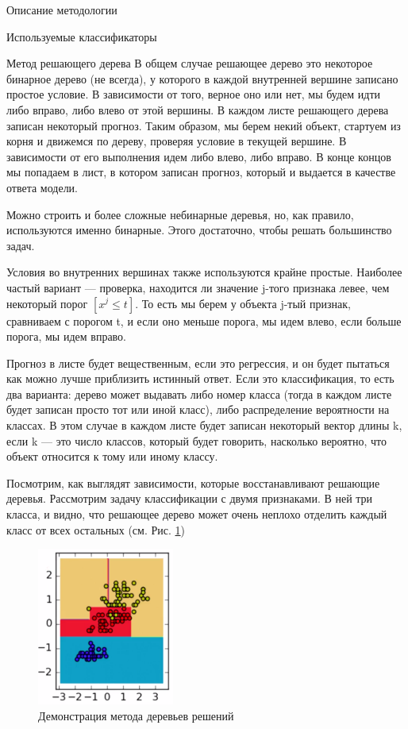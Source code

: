 \begin{section}{Описание методологии}
\begin{subsection}{Используемые классификаторы}
\begin{subsubsection}{Метод решающего дерева}
 В общем случае решающее дерево это некоторое бинарное дерево (не всегда), у которого в каждой внутренней вершине записано простое условие. В зависимости от того, верное оно или нет, мы будем идти либо вправо, либо влево от этой вершины. В каждом листе решающего дерева записан некоторый прогноз. Таким образом, мы берем некий объект, стартуем из корня и движемся по дереву, проверяя условие в текущей вершине. В зависимости от его выполнения идем либо влево, либо вправо. В конце концов мы попадаем в лист, в котором записан прогноз, который и выдается в качестве ответа модели.

 Можно строить и более сложные небинарные деревья, но, как правило, используются именно бинарные. Этого достаточно, чтобы решать большинство задач.


 Условия во внутренних вершинах также используются крайне простые. Наиболее частый вариант — проверка, находится ли значение j-того признака левее, чем некоторый порог $[x^j \leq t]$. То есть мы берем у объекта j-тый признак, сравниваем с порогом t, и если оно меньше порога, мы идем влево, если больше порога, мы идем вправо.


  Прогноз в листе будет вещественным, если это регрессия, и он будет пытаться как можно лучше приблизить истинный ответ. Если это классификация, то есть два варианта: дерево может выдавать либо номер класса (тогда в каждом листе будет записан просто тот или иной класс), либо распределение вероятности на классах. В этом случае в каждом листе будет записан некоторый вектор длины k, если k — это число классов, который будет говорить, насколько вероятно, что объект относится к тому или иному классу.

  Посмотрим, как выглядят зависимости, которые восстанавливают решающие деревья. Рассмотрим задачу классификации с двумя признаками. В ней три класса, и видно, что решающее дерево может очень неплохо отделить каждый класс от всех остальных (см. Рис. \ref{pic:dt2})


  \begin{figure}[ht!]
\centering
\includegraphics[width=0.4\textwidth]{pics/dt2}
\caption{Демонстрация метода деревьев решений}
\label{pic:dt2}
\end{figure}


\end{subsubsection}
\end{subsection}
\end{section}
